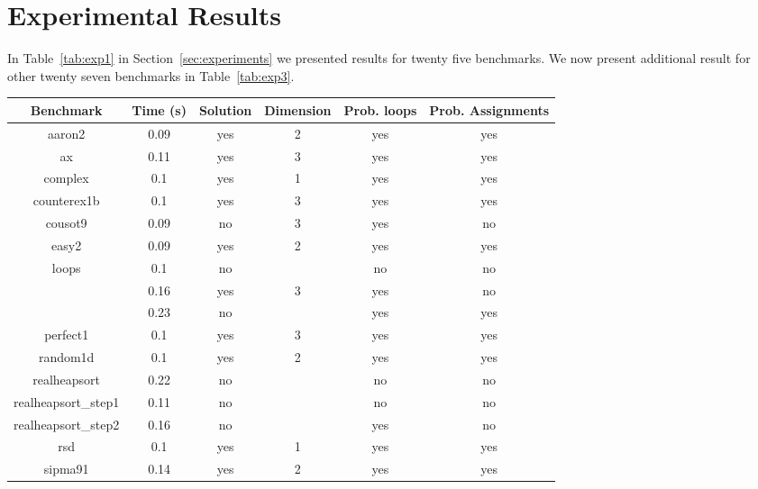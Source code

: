 
\section{Experimental Results}\label{sec:app_ex}
In Table~\ref{tab:exp1} in Section~\ref{sec:experiments} we presented results for twenty five benchmarks.
We now present additional result for other twenty seven benchmarks in Table~\ref{tab:exp3}.



\begin{center}
\begin{table}[]
  \centering
   \begin{tabular}{c|c|c|c|c|c}
    
{Benchmark} & {Time (s)} & {Solution} & {Dimension} & {Prob. loops} & {Prob. Assignments} \\\hline \hline
{aaron2} & {0.09} & {yes} & {2} & {yes} & {yes} \\\hline
{ax} & {0.11} & {yes} & {3} & {yes} & {yes} \\\hline
{complex} & {0.1} & {yes} & {1} & {yes} & {yes} \\\hline
{counterex1b} & {0.1} & {yes} & {3} & {yes} & {yes} \\\hline
{cousot9} & {0.09} & {no} & {3} & {yes} & {no} \\\hline
{easy2} & {0.09} & {yes} & {2} & {yes} & {yes} \\\hline
{loops} & {0.1} & {no} & {} & {no} & {no} \\\hline
{\multirow{2}{*}{nestedloop}} & {0.16} & {yes} & {3} & {yes} & {no} \\\cline{2-6}
{} & {0.23} & {no} & {} & {yes} & {yes} \\\hline
{perfect1} & {0.1} & {yes} & {3} & {yes} & {yes} \\\hline
{random1d} & {0.1} & {yes} & {2} & {yes} & {yes} \\\hline
{realheapsort} & {0.22} & {no} & {} & {no} & {no} \\\hline
{realheapsort\_step1} & {0.11} & {no} & {} & {no} & {no} \\\hline
{realheapsort\_step2} & {0.16} & {no} & {} & {yes} & {no} \\\hline
{rsd} & {0.1} & {yes} & {1} & {yes} & {yes} \\\hline
{sipma91} & {0.14} & {yes} & {2} & {yes} & {yes} \\\hline

\end{tabular}
\end{table}
\end{center}
